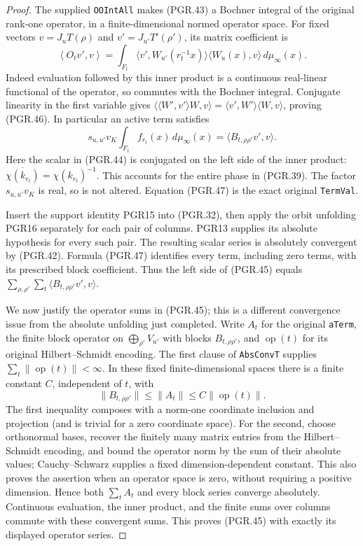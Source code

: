 \begin{proof}
The supplied \texttt{OOIntAll} makes (PGR.43) a Bochner integral
of the original rank-one operator, in a finite-dimensional normed
operator space.  For fixed vectors \(v=J_uT(\rho)\) and
\(v'=J_{u'}T'(\rho')\), its matrix coefficient is
\[
 \left\langle O_t v',v\right\rangle
  =\int_{F_t}
       \langle v',W_{u'}(r_t^{-1}x)\rangle
       \langle W_u(x),v\rangle\,d\mu_\infty(x).
\tag{PGR.46}
\]
Indeed evaluation followed by this inner product is a continuous
real-linear functional of the operator, so commutes with the
Bochner integral.  Conjugate linearity in the first variable gives
\(\langle\langle W',v'\rangle W,v\rangle
=\langle v',W'\rangle\langle W,v\rangle\), proving (PGR.46).
In particular an active term satisfies
\[
 s_{u,u'}v_K\int_{F_t}f_{r_t}(x)\,d\mu_\infty(x)
       =\langle B_{t,\rho\rho'}v',v\rangle.
\tag{PGR.47}
\]
Here the scalar in (PGR.44) is conjugated on the left side of the
inner product: \(\overline{\chi(k_{r_t})}=\chi(k_{r_t})^{-1}\).
This accounts for the entire phase in (PGR.39).  The factor
\(s_{u,u'}v_K\) is real, so is not altered.  Equation (PGR.47)
is the exact original \texttt{TermVal}.

Insert the support identity PGR15 into (PGR.32), then apply the
orbit unfolding PGR16 separately for each pair of columns.  PGR13
supplies its absolute hypothesis for every such pair.  The resulting
scalar series is absolutely convergent by (PGR.42).  Formula
(PGR.47) identifies every term, including zero terms, with its
prescribed block coefficient.  Thus the left side of (PGR.45) equals
\(\sum_{\rho,\rho'}\sum_t
\langle B_{t,\rho\rho'}v',v\rangle\).

We now justify the operator sums in (PGR.45); this is a different
convergence issue from the absolute unfolding just completed.  Write
\(A_t\) for the original \texttt{aTerm}, the finite block
operator on \(\bigoplus_{\rho'}V_{u'}\) with blocks
\(B_{t,\rho\rho'}\), and \(\operatorname{op}(t)\) for its
original Hilbert--Schmidt encoding.  The first clause of
\texttt{AbsConvT} supplies
\(\sum_t\|\operatorname{op}(t)\|<\infty\).
In these fixed finite-dimensional spaces there is a finite constant
\(C\), independent of \(t\), with
\[
 \|B_{t,\rho\rho'}\|\leq\|A_t\|
                        \leq C\|\operatorname{op}(t)\|.
\tag{PGR.48}
\]
The first inequality composes with a norm-one coordinate inclusion
and projection (and is trivial for a zero coordinate space).  For
the second, choose orthonormal bases, recover the finitely many
matrix entries from the Hilbert--Schmidt encoding, and bound the
operator norm by the sum of their absolute values; Cauchy--Schwarz
supplies a fixed dimension-dependent constant.  This also proves
the assertion when an operator space is zero, without requiring a
positive dimension.  Hence both \(\sum_tA_t\) and every block
series converge absolutely.  Continuous evaluation, the inner
product, and the finite sums over columns commute with these
convergent sums.  This proves (PGR.45) with exactly its displayed
operator series.
\end{proof}

